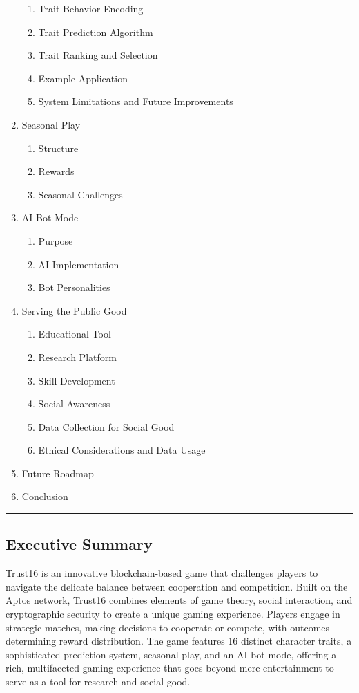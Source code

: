 \documentclass[]{article}
\begin{document}
\begin{enumerate}
   \begin{enumerate}
   \item Trait Behavior Encoding
   \item Trait Prediction Algorithm
   \item Trait Ranking and Selection
   \item Example Application
   \item System Limitations and Future Improvements
   \end{enumerate}
\item Seasonal Play
   \begin{enumerate}
   \item Structure
   \item Rewards
   \item Seasonal Challenges
   \end{enumerate}
\item AI Bot Mode
   \begin{enumerate}
   \item Purpose
   \item AI Implementation
   \item Bot Personalities
   \end{enumerate}
\item Serving the Public Good
   \begin{enumerate}
   \item Educational Tool
   \item Research Platform
   \item Skill Development
   \item Social Awareness
   \item Data Collection for Social Good
   \item Ethical Considerations and Data Usage
   \end{enumerate}
\item Future Roadmap
\item Conclusion
\end{enumerate}

\begin{center}\rule{0.5\linewidth}{0.5pt}\end{center}

\hypertarget{executive-summary}{%
\subsection{Executive Summary}\label{executive-summary}}

Trust16 is an innovative blockchain-based game that challenges players
to navigate the delicate balance between cooperation and competition.
Built on the Aptos network, Trust16 combines elements of game theory,
social interaction, and cryptographic security to create a unique gaming
experience. Players engage in strategic matches, making decisions to
cooperate or compete, with outcomes determining reward distribution. The
game features 16 distinct character traits, a sophisticated prediction
system, seasonal play, and an AI bot mode, offering a rich, multifaceted
gaming experience that goes beyond mere entertainment to serve as a tool
for research and social good.
\end{document}
